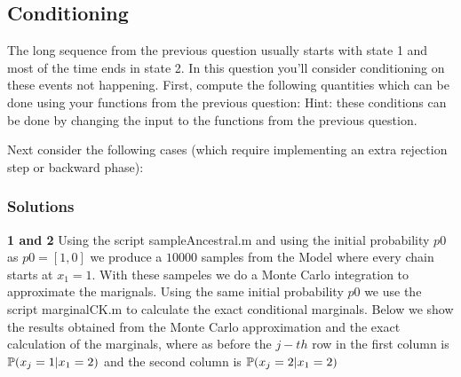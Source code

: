 \documentclass{article}
\begin{document}
\subsection{Conditioning}

The long sequence from the previous question usually starts with state 1 and most of the time ends in state 2. In this question you'll consider conditioning on these events not happening. First, compute the following quantities which can be done using your functions from the previous question:
Hint: these conditions can be done by changing the input to the functions from the previous question.

Next consider the following cases (which require implementing an extra rejection step or backward phase):


\subsubsection*{Solutions}

\textbf{1 and 2}
\newline
Using the script sampleAncestral.m and using the initial probability $p0$ as $p0=[1,0]$ we produce a $10000$ samples from the Model where
every chain starts at $x_{1}=1$. With these sampeles we do a  Monte Carlo integration to approximate the marignals. Using the same
initial probability $p0$ we use the script marginalCK.m to calculate the exact conditional marginals. Below we show the results
obtained from the Monte Carlo approximation and the exact calculation of the marginals,
 where as before the $j-th$ row
in the first column is $\mathbb{P}(x_{j}=1|x_{1}=2)$ and the second column is $\mathbb{P}(x_{j}=2|x_{1}=2)$
\end{document}
